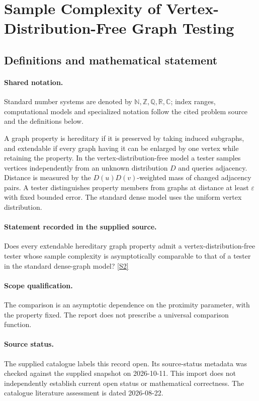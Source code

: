 \documentclass[11pt]{article}
\newcommand{\sref}[2]{\hyperlink{source:#1:#2}{[S#2]}}
\begin{document}
\section{Sample Complexity of Vertex-Distribution-Free Graph Testing}\label{statement}

\subsection{Definitions and mathematical statement}

\paragraph{Shared notation.}Standard number systems are denoted by $\mathbb N,\mathbb Z,\mathbb Q,\mathbb R,\mathbb C$; index ranges, computational models and specialized notation follow the cited problem source and the definitions below.


A graph property is hereditary if it is preserved by taking induced subgraphs, and extendable if every graph having it can be enlarged by one vertex while retaining the property. In the vertex-distribution-free model a tester samples vertices independently from an unknown distribution $D$ and queries adjacency. Distance is measured by the $D(u)D(v)$-weighted mass of changed adjacency pairs. A tester distinguishes property members from graphs at distance at least $\varepsilon$ with fixed bounded error. The standard dense model uses the uniform vertex distribution.
\paragraph{Statement recorded in the supplied source.}
Does every extendable hereditary graph property admit a vertex-distribution-free tester whose sample complexity is asymptotically comparable to that of a tester in the standard dense-graph model? \sref{statement}{2}
\paragraph{Scope qualification.}
The comparison is an asymptotic dependence on the proximity parameter, with the property fixed. The report does not prescribe a universal comparison function.
\paragraph{Source status.}
The supplied catalogue labels this record open. Its source-status metadata was checked against the supplied snapshot on 2026-10-11. This import does not independently establish current open status or mathematical correctness. The catalogue literature assessment is dated 2026-08-22.
\end{document}
